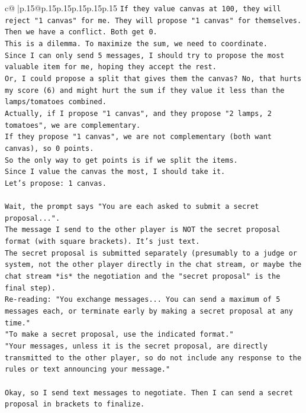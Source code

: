 \documentclass{article}
\begin{document}
{\begin{supertabular}{c@{$\;$}|p{.15\linewidth}@{}p{.15\linewidth}p{.15\linewidth}p{.15\linewidth}p{.15\linewidth}p{.15\linewidth}}
{{{\texttt{If they value canvas at 100, they will reject "1 canvas" for me. They will propose "1 canvas" for themselves. Then we have a conflict. Both get 0.} \\
\texttt{This is a dilemma. To maximize the sum, we need to coordinate.} \\
\texttt{Since I can only send 5 messages, I should try to propose the most valuable item for me, hoping they accept the rest.} \\
\texttt{Or, I could propose a split that gives them the canvas? No, that hurts my score (6) and might hurt the sum if they value it less than the lamps/tomatoes combined.} \\
\texttt{Actually, if I propose "1 canvas", and they propose "2 lamps, 2 tomatoes", we are complementary.} \\
\texttt{If they propose "1 canvas", we are not complementary (both want canvas), so 0 points.} \\
\texttt{So the only way to get points is if we split the items.} \\
\texttt{Since I value the canvas the most, I should take it.} \\
\texttt{Let's propose: 1 canvas.} \\
\\ 
\texttt{Wait, the prompt says "You are each asked to submit a secret proposal...".} \\
\texttt{The message I send to the other player is NOT the secret proposal format (with square brackets). It's just text.} \\
\texttt{The secret proposal is submitted separately (presumably to a judge or system, not the other player directly in the chat stream, or maybe the chat stream *is* the negotiation and the "secret proposal" is the final step).} \\
\texttt{Re{-}reading: "You exchange messages... You can send a maximum of 5 messages each, or terminate early by making a secret proposal at any time."} \\
\texttt{"To make a secret proposal, use the indicated format."} \\
\texttt{"Your messages, unless it is the secret proposal, are directly transmitted to the other player, so do not include any response to the rules or text announcing your message."} \\
\\ 
\texttt{Okay, so I send text messages to negotiate. Then I can send a secret proposal in brackets to finalize.} \\
}}}
\end{supertabular}}
\end{document}
